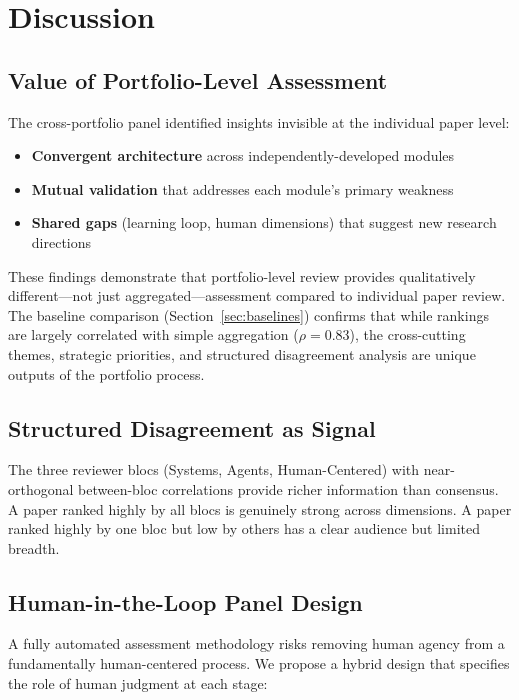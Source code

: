 \section{Discussion}

\subsection{Value of Portfolio-Level Assessment}

The cross-portfolio panel identified insights invisible at the individual paper level:
\begin{itemize}
    \item \textbf{Convergent architecture} across independently-developed modules
    \item \textbf{Mutual validation} that addresses each module's primary weakness
    \item \textbf{Shared gaps} (learning loop, human dimensions) that suggest new research directions
\end{itemize}

These findings demonstrate that portfolio-level review provides qualitatively different---not just aggregated---assessment compared to individual paper review. The baseline comparison (Section~\ref{sec:baselines}) confirms that while rankings are largely correlated with simple aggregation ($\rho = 0.83$), the cross-cutting themes, strategic priorities, and structured disagreement analysis are unique outputs of the portfolio process.

\subsection{Structured Disagreement as Signal}

The three reviewer blocs (Systems, Agents, Human-Centered) with near-orthogonal between-bloc correlations provide richer information than consensus. A paper ranked highly by all blocs is genuinely strong across dimensions. A paper ranked highly by one bloc but low by others has a clear audience but limited breadth.

\subsection{Human-in-the-Loop Panel Design}
\label{sec:hitl}

A fully automated assessment methodology risks removing human agency from a fundamentally human-centered process. We propose a hybrid design that specifies the role of human judgment at each stage:

